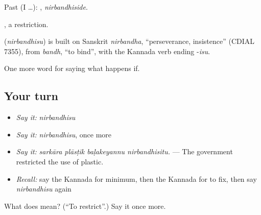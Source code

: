Past (I …): , \emph{nirbandhiside}.

, a restriction.

\begin{cousinweb}
\textbf{} (\emph{nirbandhisu}) is built on Sanskrit \emph{nirbandha}, \textquotedblleft{}perseverance, insistence\textquotedblright{} (CDIAL 7355), from \emph{bandh}, \textquotedblleft{}to bind\textquotedblright{}, with the Kannada verb ending -\emph{isu}.
\end{cousinweb}

\begin{grammarlens}[title={What you've built}]
One more word for saying what happens if.
\end{grammarlens}

\subsection*{Your turn}
\begin{itemize}
\raggedright
  \item \emph{Say it:} \emph{nirbandhisu}
  \item \emph{Say it:} \emph{nirbandhisu}, once more
  \item \emph{Say it:} \emph{sarkāra plāsṭik baḷakeyannu nirbandhisitu.} — The government restricted the use of plastic.
  \item \emph{Recall:} say the Kannada for minimum, then the Kannada for to fix, then say \emph{nirbandhisu} again
\end{itemize}

\begin{tcolorbox}[breakable,colback=teal!4,colframe=teal!35!black,title={Before you move on}]
What does  mean? (\textquotedblleft{}To restrict\textquotedblright{}.) Say it once more.
\end{tcolorbox}
